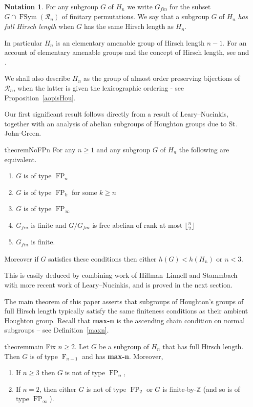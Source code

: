 \documentclass[11pt,a4paper]{amsart}
\theoremstyle{definition}
\newtheorem*{notation*}{Notation}
\theoremstyle{remark}
\newcommand{\FSym}{\operatorname{FSym}}
\newcommand{\Z}{\mathbb Z}
\newcommand{\Ra}{\mathcal{R}}
\newcommand{\fpinfty}{{\FP}_{\infty}}
\newcommand{\FFF}{\operatorname{F}}
\newcommand{\FP}{\operatorname{FP}}
\newcommand{\gfin}{G_{\textit{fin}}}
\begin{document}
\begin{notation*} For any subgroup $G$ of $H_n$ we write $\gfin$ for the subset $G\cap\FSym(\Ra_n)$ of finitary permutations. We say that a subgroup $G$ of $H_n$ \emph{has full Hirsch length} when $G$ has the same Hirsch length as $H_n$.
\end{notation*}

In particular $H_n$ is an elementary amenable group of Hirsch length $n-1$. For an account of elementary amenable groups and the concept of Hirsch length, see \cite{HL} and \cite[Definition I.15]{Bridson2015}.

We shall also describe $H_n$ as the group of almost order preserving bijections of $\Ra_n$, when the latter is given the lexicographic ordering - see Proposition~\ref{aopisHou}. 

Our first significant result follows directly from a result of Leary--Nucinkis, \cite{Leary2001} together with an analysis of abelian subgroups of Houghton groups due to St. John-Green.

\begin{restatable*}{theorem}{NoFPn}\label{NoFPn}
	For any $n\ge1$ and any subgroup $G$ of $H_n$ the following are equivalent.
	\begin{enumerate}
	\item $G$ is of type $\FP_n$
	\item $G$ is of type $\FP_k$ for some $k\ge n$
	\item $G$ is of type $\fpinfty$
	\item $\gfin$ is finite and $G/\gfin$ is free abelian of rank at most $\lfloor\frac n2\rfloor$
	\item $\gfin$ is finite.
	\end{enumerate}
Moreover if $G$ satisfies these conditions then either 
$h(G)<h(H_n)$ or $n<3$. 
\end{restatable*} 
This is easily deduced by combining work of Hillman--Linnell and Stammbach with more recent work of Leary--Nucinkis, and is proved in the next section.

The main theorem of this paper asserts that subgroups of Houghton's groups of full Hirsch length typically satisfy the same finiteness conditions as their ambient Houghton group. Recall that \textbf{max-n} is the ascending chain condition on normal subgroups -- see Definition~\ref{maxn}. 

\begin{restatable*}{theorem}{main}	\label{main}
Fix $n\ge 2$. Let $G$ be a subgroup of $H_n$ that has full Hirsch length. Then $G$ is of type $\FFF_{n-1}$ and has \textbf{max-n}. Moreover, 
	\begin{enumerate}
		\item If $n \ge 3$ then $G$ is not of type $\FP_n$, 
		\item If $n=2$, then either $G$ is not of type $\FP_2$ or $G$ is finite-by-$\Z$ (and so is of type $\fpinfty$).
	\end{enumerate}
\end{restatable*}
\end{document}
